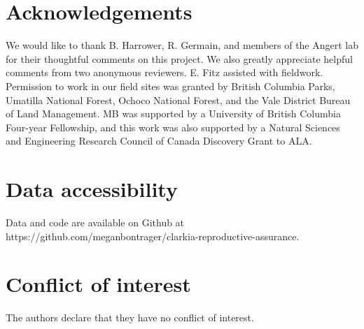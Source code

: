 \documentclass{article}
\begin{document}
\section*{Acknowledgements}
We would like to thank B. Harrower, R. Germain, and members of the Angert lab for their thoughtful comments on this project. We also greatly appreciate helpful comments from two anonymous reviewers. E. Fitz assisted with fieldwork. Permission to work in our field sites was granted by British Columbia Parks, Umatilla National Forest, Ochoco National Forest, and the Vale District Bureau of Land Management. MB was supported by a University of British Columbia Four-year Fellowship, and this work was also supported by a Natural Sciences and Engineering Research Council of Canada Discovery Grant to ALA.

\section*{Data accessibility}
Data and code are available on Github at https://github.com/meganbontrager/clarkia-reproductive-assurance. 

\section*{Conflict of interest} 
The authors declare that they have no conflict of interest.



\clearpage
\end{document}
